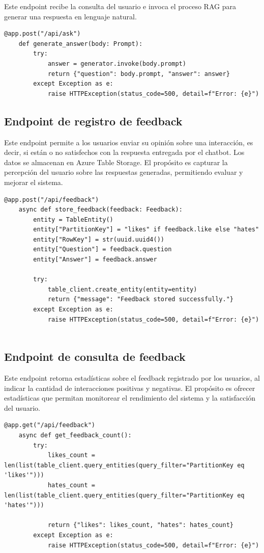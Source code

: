 Este endpoint recibe la consulta del usuario e invoca el proceso RAG para generar una respuesta en lenguaje natural.

\begin{lstlisting}[label=cod:api-1,caption=Endpoint de generación de respuestas.]
	@app.post("/api/ask")
	def generate_answer(body: Prompt):
		try:
			answer = generator.invoke(body.prompt)
			return {"question": body.prompt, "answer": answer}
		except Exception as e:
			raise HTTPException(status_code=500, detail=f"Error: {e}")	
\end{lstlisting}

\subsection{Endpoint de registro de feedback}

Este endpoint permite a los usuarios enviar su opinión sobre una interacción, es decir, si están o no satisfechos con 
la respuesta entregada por el chatbot. Los datos se almacenan en Azure Table Storage.
El propósito es capturar la percepción del usuario sobre las respuestas generadas, permitiendo evaluar y mejorar el sistema.

\begin{lstlisting}[label=cod:api-2,caption=Endpoint de registro de feedback.]
	@app.post("/api/feedback")
	async def store_feedback(feedback: Feedback):
		entity = TableEntity()
		entity["PartitionKey"] = "likes" if feedback.like else "hates"
		entity["RowKey"] = str(uuid.uuid4())
		entity["Question"] = feedback.question
		entity["Answer"] = feedback.answer
	
		try:
			table_client.create_entity(entity=entity)
			return {"message": "Feedback stored successfully."}
		except Exception as e:
			raise HTTPException(status_code=500, detail=f"Error: {e}")
	
\end{lstlisting}

\subsection{Endpoint de consulta de feedback}

Este endpoint retorna estadísticas sobre el feedback registrado por los usuarios, al indicar la cantidad de interacciones 
positivas y negativas. El propósito es ofrecer estadísticas que permitan monitorear el rendimiento del sistema y 
la satisfacción del usuario.

\begin{lstlisting}[label=cod:api-3,caption=Endpoint de consulta de feedback.]
	@app.get("/api/feedback")
	async def get_feedback_count():
		try:
			likes_count = len(list(table_client.query_entities(query_filter="PartitionKey eq 'likes'")))
			hates_count = len(list(table_client.query_entities(query_filter="PartitionKey eq 'hates'")))
	
			return {"likes": likes_count, "hates": hates_count}
		except Exception as e:
			raise HTTPException(status_code=500, detail=f"Error: {e}")	
\end{lstlisting}


